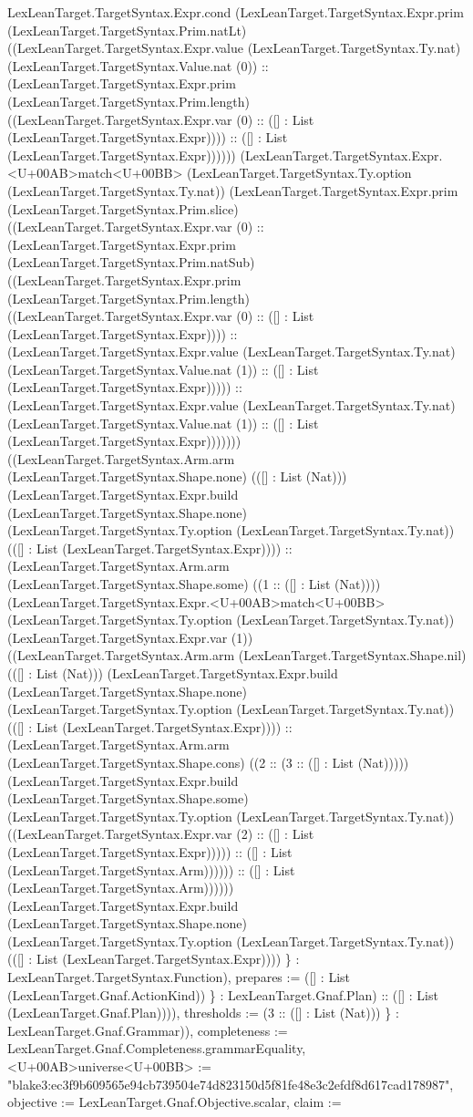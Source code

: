 \documentclass[11pt]{article}
\begin{document}
LexLeanTarget.TargetSyntax.Expr.cond (LexLeanTarget.TargetSyntax.Expr.prim (LexLeanTarget.TargetSyntax.Prim.natLt) ((LexLeanTarget.TargetSyntax.Expr.value (LexLeanTarget.TargetSyntax.Ty.nat) (LexLeanTarget.TargetSyntax.Value.nat (0)) :: (LexLeanTarget.TargetSyntax.Expr.prim (LexLeanTarget.TargetSyntax.Prim.length) ((LexLeanTarget.TargetSyntax.Expr.var (0) :: ([] : List (LexLeanTarget.TargetSyntax.Expr)))) :: ([] : List (LexLeanTarget.TargetSyntax.Expr)))))) (LexLeanTarget.TargetSyntax.Expr.<U+00AB>match<U+00BB> (LexLeanTarget.TargetSyntax.Ty.option (LexLeanTarget.TargetSyntax.Ty.nat)) (LexLeanTarget.TargetSyntax.Expr.prim (LexLeanTarget.TargetSyntax.Prim.slice) ((LexLeanTarget.TargetSyntax.Expr.var (0) :: (LexLeanTarget.TargetSyntax.Expr.prim (LexLeanTarget.TargetSyntax.Prim.natSub) ((LexLeanTarget.TargetSyntax.Expr.prim (LexLeanTarget.TargetSyntax.Prim.length) ((LexLeanTarget.TargetSyntax.Expr.var (0) :: ([] : List (LexLeanTarget.TargetSyntax.Expr)))) :: (LexLeanTarget.TargetSyntax.Expr.value (LexLeanTarget.TargetSyntax.Ty.nat) (LexLeanTarget.TargetSyntax.Value.nat (1)) :: ([] : List (LexLeanTarget.TargetSyntax.Expr))))) :: (LexLeanTarget.TargetSyntax.Expr.value (LexLeanTarget.TargetSyntax.Ty.nat) (LexLeanTarget.TargetSyntax.Value.nat (1)) :: ([] : List (LexLeanTarget.TargetSyntax.Expr))))))) ((LexLeanTarget.TargetSyntax.Arm.arm (LexLeanTarget.TargetSyntax.Shape.none) (([] : List (Nat))) (LexLeanTarget.TargetSyntax.Expr.build (LexLeanTarget.TargetSyntax.Shape.none) (LexLeanTarget.TargetSyntax.Ty.option (LexLeanTarget.TargetSyntax.Ty.nat)) (([] : List (LexLeanTarget.TargetSyntax.Expr)))) :: (LexLeanTarget.TargetSyntax.Arm.arm (LexLeanTarget.TargetSyntax.Shape.some) ((1 :: ([] : List (Nat)))) (LexLeanTarget.TargetSyntax.Expr.<U+00AB>match<U+00BB> (LexLeanTarget.TargetSyntax.Ty.option (LexLeanTarget.TargetSyntax.Ty.nat)) (LexLeanTarget.TargetSyntax.Expr.var (1)) ((LexLeanTarget.TargetSyntax.Arm.arm (LexLeanTarget.TargetSyntax.Shape.nil) (([] : List (Nat))) (LexLeanTarget.TargetSyntax.Expr.build (LexLeanTarget.TargetSyntax.Shape.none) (LexLeanTarget.TargetSyntax.Ty.option (LexLeanTarget.TargetSyntax.Ty.nat)) (([] : List (LexLeanTarget.TargetSyntax.Expr)))) :: (LexLeanTarget.TargetSyntax.Arm.arm (LexLeanTarget.TargetSyntax.Shape.cons) ((2 :: (3 :: ([] : List (Nat))))) (LexLeanTarget.TargetSyntax.Expr.build (LexLeanTarget.TargetSyntax.Shape.some) (LexLeanTarget.TargetSyntax.Ty.option (LexLeanTarget.TargetSyntax.Ty.nat)) ((LexLeanTarget.TargetSyntax.Expr.var (2) :: ([] : List (LexLeanTarget.TargetSyntax.Expr))))) :: ([] : List (LexLeanTarget.TargetSyntax.Arm)))))) :: ([] : List (LexLeanTarget.TargetSyntax.Arm)))))) (LexLeanTarget.TargetSyntax.Expr.build (LexLeanTarget.TargetSyntax.Shape.none) (LexLeanTarget.TargetSyntax.Ty.option (LexLeanTarget.TargetSyntax.Ty.nat)) (([] : List (LexLeanTarget.TargetSyntax.Expr)))) \} : LexLeanTarget.TargetSyntax.Function), prepares := ([] : List (LexLeanTarget.Gnaf.ActionKind)) \} : LexLeanTarget.Gnaf.Plan) :: ([] : List (LexLeanTarget.Gnaf.Plan)))), thresholds := (3 :: ([] : List (Nat))) \} : LexLeanTarget.Gnaf.Grammar)), completeness := LexLeanTarget.Gnaf.Completeness.grammarEquality, <U+00AB>universe<U+00BB> := "blake3:ec3f9b609565e94cb739504e74d823150d5f81fe48e3c2efdf8d617cad178987", objective := LexLeanTarget.Gnaf.Objective.scalar, claim := 
\end{document}
